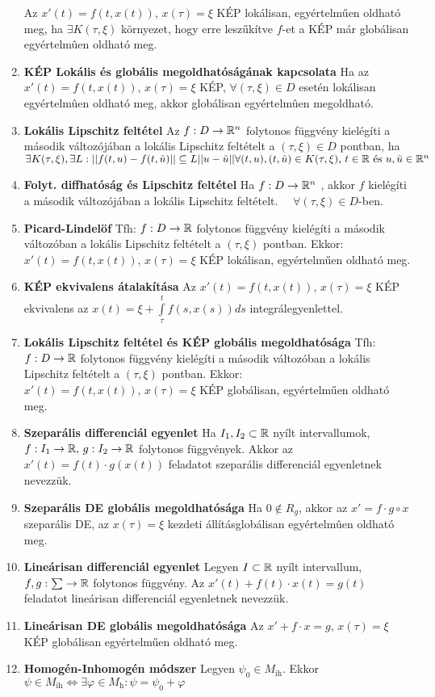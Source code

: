 \documentclass{article}
\begin{document}
\begin{enumerate}
	Az $x'(t)=f(t, x(t))\text{,  }x(\tau)=\xi$ KÉP lokálisan, egyértelműen oldható meg, ha
	$\exists K(\tau,\xi)$ környezet, hogy erre leszűkítve $f$-et  a KÉP már globálisan egyértelmûen oldható meg.
	\item\textbf{KÉP Lokális és globális megoldhatóságának kapcsolata}\br
	Ha az $x'(t)=f(t, x(t))\text{,  }x(\tau)=\xi$ KÉP, $\forall(\tau,\xi)\in D$
	esetén lokálisan egyértelmûen oldható meg, akkor globálisan egyértelmûen megoldható.
	\item\textbf{Lokális Lipschitz feltétel}\br
	Az $f:D\rightarrow\mathbb{R}^n$ folytonos függvény kielégíti a második változójában a lokális Lipschitz
	feltételt a $(\tau,\xi)\in D$ pontban, ha $\exists K(\tau,\xi),\exists
	L:||f(t,u)-f(t,\tilde{u})||\subseteq L||u-\tilde{u}||\br\forall(t,u),(t,
	\tilde{u})\in K(\tau,\xi)\text{,  }t\in\R\text{  és  }u,\tilde{u}\in\R^n$
	\item\textbf{Folyt. diffhatóság és Lipschitz feltétel}\br
	Ha $f:D\rightarrow\mathbb{R}^n$ \folytdifh, akkor $f$ kielégíti a második változójában a lokális Lipschitz feltételt.
	$\quad\forall(\tau,\xi)\in D$-ben.
	\item\textbf{Picard-Lindelöf}\br
	Tfh: $f:D\rightarrow\mathbb{R}$ folytonos függvény kielégíti a második változóban a lokális Lipschitz feltételt a
	$(\tau,\xi)$ pontban. Ekkor: $x'(t)=f(t, x(t))\text{,  }x(\tau)=\xi$ KÉP lokálisan, egyértelműen oldható meg.
	\item\textbf{KÉP ekvivalens átalakítása}\br
	Az $x'(t)=f(t, x(t))\text{,  }x(\tau)=\xi$ KÉP ekvivalens az $x(t)=\xi+
	\int\limits_{\tau}^{t}f(s,x(s))ds$ integrálegyenlettel.
	\item\textbf{Lokális Lipschitz feltétel és KÉP globális megoldhatósága}\br
	Tfh: $f:D\rightarrow\mathbb{R}$ folytonos függvény kielégíti a második változóban a lokális Lipschitz feltételt a
	$(\tau,\xi)$ pontban. Ekkor: $x'(t)=f(t, x(t))\text{,  }x(\tau)=\xi$ KÉP globálisan, egyértelműen oldható meg.
	\item\textbf{Szeparális differenciál egyenlet}\br
	Ha $I_1,I_2\subset\mathbb{R}$ nyílt intervallumok, $f:I_1\rightarrow\mathbb{R}\text{,  }
	g:I_2\rightarrow\mathbb{R}$ folytonos függvények.\br
	Akkor az $x'(t)=f(t)\cdot g(x(t))$ feladatot szeparális differenciál egyenletnek nevezzük.
	\item\textbf{Szeparális DE globális megoldhatósága}\br
	Ha $0\notin R_g$, akkor az $x'=f\cdot g \circ x$ szeparális DE, az 
	$x(\tau)=\xi$ kezdeti állítás\br globálisan egyértelmûen oldható meg.
	\item\textbf{Lineárisan differenciál egyenlet}\br
	Legyen $I\subset\mathbb{R}$ nyílt intervallum, $f,g:\sum\rightarrow\mathbb{R}$ folytonos függvény.
	Az $x'(t)+f(t)\cdot x(t)=g(t)$ feladatot lineárisan differenciál egyenletnek nevezzük.
	\item\textbf{Lineárisan DE globális megoldhatósága}\br
	Az $x'+f\cdot x=g\text{,  }x(\tau)=\xi$ KÉP globálisan egyértelműen oldható meg.
	\item\textbf{Homogén-Inhomogén módszer}\br
	Legyen $\psi_0\in M_{\text{ih}}$. Ekkor $\psi\in M_{\text{ih}}\Leftrightarrow
	\exists\varphi\in M_{\text{h}}:\psi=\psi_0+\varphi$
\end{enumerate}
\end{document}
